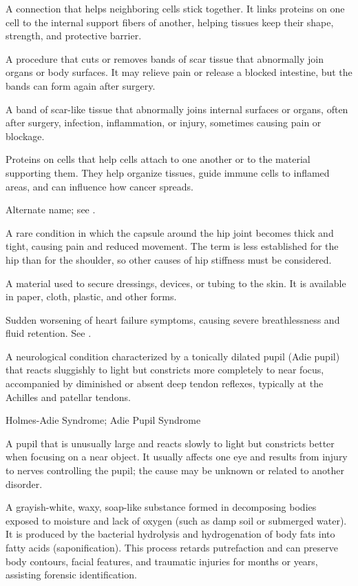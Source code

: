  A connection that helps neighboring cells stick together. It links proteins on one cell to the internal support fibers of another, helping tissues keep their shape, strength, and protective barrier.

 A procedure that cuts or removes bands of scar tissue that abnormally join organs or body surfaces. It may relieve pain or release a blocked intestine, but the bands can form again after surgery.

 A band of scar-like tissue that abnormally joins internal surfaces or organs, often after surgery, infection, inflammation, or injury, sometimes causing pain or blockage.

 Proteins on cells that help cells attach to one another or to the material supporting them. They help organize tissues, guide immune cells to inflamed areas, and can influence how cancer spreads.

 Alternate name; see .

 A rare condition in which the capsule around the hip joint becomes thick and tight, causing pain and reduced movement. The term is less established for the hip than for the shoulder, so other causes of hip stiffness must be considered.

 A material used to secure dressings, devices, or tubing to the skin. It is available in paper, cloth, plastic, and other forms.

 Sudden worsening of heart failure symptoms, causing severe breathlessness and fluid retention. See .

 A neurological condition characterized by a tonically dilated pupil (Adie pupil) that reacts sluggishly to light but constricts more completely to near focus, accompanied by diminished or absent deep tendon reflexes, typically at the Achilles and patellar tendons.

\synonyms
Holmes-Adie Syndrome; Adie Pupil Syndrome

 A pupil that is unusually large and reacts slowly to light but constricts better when focusing on a near object. It usually affects one eye and results from injury to nerves controlling the pupil; the cause may be unknown or related to another disorder.

 A grayish-white, waxy, soap-like substance formed in decomposing bodies exposed to moisture and lack of oxygen (such as damp soil or submerged water). It is produced by the bacterial hydrolysis and hydrogenation of body fats into fatty acids (saponification). This process retards putrefaction and can preserve body contours, facial features, and traumatic injuries for months or years, assisting forensic identification.

